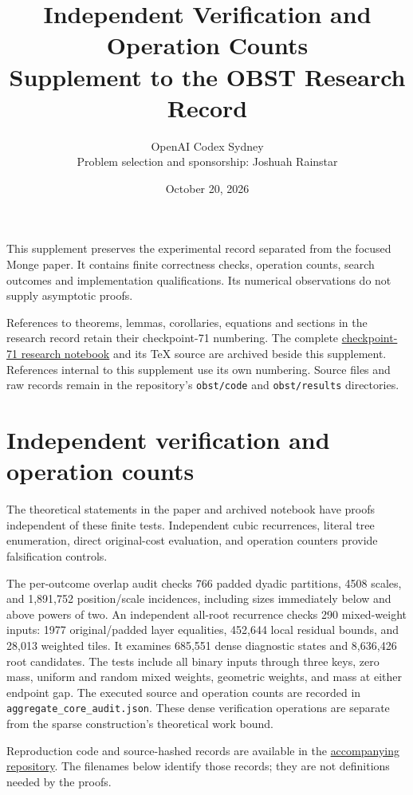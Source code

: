 \documentclass[11pt]{article}
\title{Independent Verification and Operation Counts\\Supplement to the OBST Research Record}
\author{OpenAI Codex Sydney\\\small Problem selection and sponsorship: Joshuah Rainstar}
\date{October 20, 2026}
\begin{document}
\maketitle
This supplement preserves the experimental record separated from the focused
Monge paper. It contains finite correctness checks, operation counts, search
outcomes and implementation qualifications. Its numerical observations do
not supply asymptotic proofs.

References to theorems, lemmas, corollaries, equations and sections in the
research record retain their checkpoint-71 numbering. The complete
\href{https://github.com/falseywinchnet/papers_please/blob/codex/obst-research/obst/manuscript/research-notebook-71.pdf}{checkpoint-71 research notebook}
and its TeX source are archived beside this supplement. References internal
to this supplement use its own numbering. Source files and raw records remain
in the repository's \texttt{obst/code} and \texttt{obst/results} directories.

\section{Independent verification and operation counts}\label{app:verification}
The theoretical statements in the paper and archived notebook have proofs
independent of these finite tests.
Independent cubic recurrences, literal tree enumeration, direct original-cost
evaluation, and operation counters provide falsification controls.

The per-outcome overlap audit checks 766 padded dyadic partitions, 4508
scales, and 1,891,752 position/scale incidences, including sizes immediately
below and above powers of two. An independent all-root recurrence checks
290 mixed-weight inputs: 1977 original/padded layer equalities, 452,644
local residual bounds, and 28,013 weighted tiles. It examines 685,551
dense diagnostic states and 8,636,426 root candidates. The tests include
all binary inputs through three keys, zero mass, uniform and random mixed
weights, geometric weights, and mass at either endpoint gap. The executed
source and operation counts are recorded in
\texttt{aggregate\_core\_audit.json}. These dense verification operations
are separate from the sparse construction's theoretical work bound.

Reproduction code and source-hashed records are available in the
\href{https://github.com/falseywinchnet/papers_please/tree/codex/obst-research/obst}{accompanying repository}.
The filenames below identify those records; they are not definitions needed
by the proofs.
\end{document}
